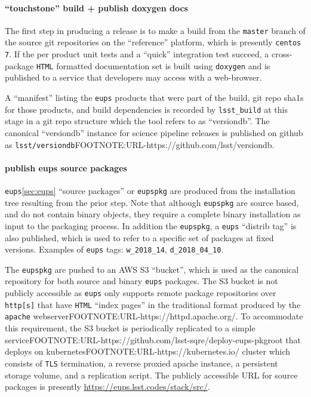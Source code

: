 \paragraph{``touchstone'' build + publish doxygen docs}

The first step in producing a release is to make a build from the
\texttt{master} branch of the source git repositories on the ``reference''
platform, which is presently \texttt{centos 7}.  If the per product unit tests
and a ``quick'' integration test succeed, a cross-package \texttt{HTML}
formatted documentation set is built using \texttt{doxygen} and is published to
a service that developers may access with a web-browser.

A ``manifest'' listing the \texttt{eups} products that were part of the build,
git repo sha1s for those products, and build dependencies is recorded by
\texttt{lsst\_build} at this stage in a git repo structure which the tool
refers to as ``versiondb''.  The canonical ``versiondb'' instance for science
pipeline releases is published on github as
\texttt{lsst/versiondb}FOOTNOTE:URL-https://github.com/lsst/versiondb.

\paragraph{publish eups source packages}
\label{sec:scipipe-deploy-src}

\texttt{eups}\ref{sec:eups} ``source packages'' or \texttt{eupspkg} are
produced from the installation tree resulting from the prior step.  Note that
although \texttt{eupspkg} are source based, and do not contain binary objects,
they require a complete binary installation as input to the packaging process.
In addition the \texttt{eupspkg}, a \texttt{eups} ``distrib tag'' is also
published, which is used to refer to a specific set of packages at fixed
versions.  Examples of \texttt{eups} tags: \texttt{w\_2018\_14}, \texttt{d\_2018\_04\_10}.

The \texttt{eupspkg} are pushed to an AWS S3 ``bucket'', which is used as the
canonical repository for both source and binary \texttt{eups} packages.  The S3
bucket is not publicly accessible as \texttt{eups} only supports remote
package repositories over \texttt{http[s]} that have \texttt{HTML} ``index
pages'' in the traditional format produced by the \texttt{apache}
webserverFOOTNOTE:URL-https://httpd.apache.org/.  To accommodate this
requirement, the S3 bucket is periodically replicated to a simple
serviceFOOTNOTE:URL-https://github.com/lsst-sqre/deploy-eups-pkgroot that
deploys on kubernetesFOOTNOTE:URL-https://kubernetes.io/ cluster which consists
of \texttt{TLS} termination, a reverse proxied apache instance, a persistent
storage volume, and a replication script.  The publicly accessible URL for
source packages is presently \url{https://eups.lsst.codes/stack/src/}.

